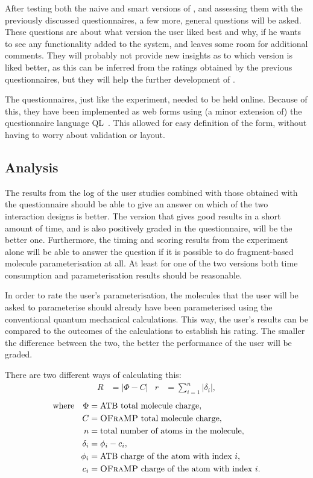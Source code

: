 After testing both the naive and smart versions of \oframp, and assessing them with the previously discussed questionnaires, a few more, general questions will be asked. These questions are about what version the user liked best and why, if he wants to see any functionality added to the system, and leaves some room for additional comments. They will probably not provide new insights as to which version is liked better, as this can be inferred from the ratings obtained by the previous questionnaires, but they will help the further development of \oframp.

The questionnaires, just like the experiment, needed to be held online. Because of this, they have been implemented as web forms using (a minor extension of) the questionnaire language QL~\cite{erdweg2013state}. This allowed for easy definition of the form, without having to worry about validation or layout.

\subsection{Analysis}
The results from the log of the user studies combined with those obtained with the questionnaire should be able to give an answer on which of the two interaction designs is better. The version that gives good results in a short amount of time, and is also positively graded in the questionnaire, will be the better one. Furthermore, the timing and scoring results from the experiment alone will be able to answer the question if it is possible to do fragment-based molecule parameterisation at all. At least for one of the two versions both time consumption and parameterisation results should be reasonable.

In order to rate the user's parameterisation, the molecules that the user will be asked to parameterise should already have been parameterised using the conventional quantum mechanical calculations. This way, the user's results can be compared to the outcomes of the calculations to establish his rating. The smaller the difference between the two, the better the performance of the user will be graded.

There are two different ways of calculating this:
\begin{align*}
R &= |\Phi - C| & r &= \sum_{i = 1}^{n} |\delta_{i}|,
\end{align*}
\vspace{-1em}
\begin{align*}
\text{where} \quad \Phi &= \text{ATB total molecule charge},\\
C &= \text{\textsc{OFraMP}{} total molecule charge},\\
n &= \text{total number of atoms in the molecule},\\
\delta_{i} &= \phi_{i} - c_{i},\\
\phi_{i} &= \text{ATB charge of the atom with index}~i,\\
c_{i} &= \text{\textsc{OFraMP}{} charge of the atom with index}~i.
\end{align*}

